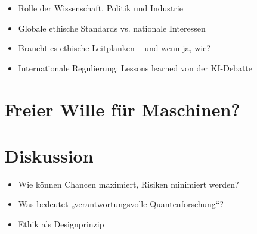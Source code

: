 \begin{itemize}
\item Rolle der Wissenschaft, Politik und Industrie
\item Globale ethische Standards vs. nationale Interessen
\item Braucht es ethische Leitplanken – und wenn ja, wie?
\item Internationale Regulierung: Lessons learned von der KI-Debatte
\end{itemize}

\section{Freier Wille für Maschinen?}


\section{Diskussion}

\begin{itemize}
\item Wie können Chancen maximiert, Risiken minimiert   werden?
\item Was bedeutet „verantwortungsvolle Quantenforschung“?
\item Ethik als Designprinzip
\end{itemize}

\printbibliography
